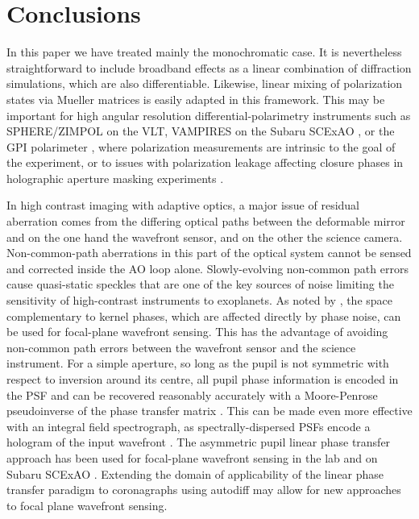 \documentclass[modern]{aastex63}
\begin{document}
\section{Conclusions}
\label{sec:conclusions}

In this paper we have treated mainly the monochromatic case. It is nevertheless straightforward to include broadband effects as a linear combination of diffraction simulations, which are also differentiable. Likewise, linear mixing of polarization states via Mueller matrices is easily adapted in this framework. This may be important for high angular resolution differential-polarimetry instruments such as SPHERE/ZIMPOL \citep{zimpol} on the VLT, VAMPIRES on the Subaru SCExAO \citep{vampires}, or the GPI polarimeter \citep{gpipol}, where polarization measurements are intrinsic to the goal of the experiment, or to issues with polarization leakage affecting closure phases in holographic aperture masking experiments \citep[e.g.][]{doelman18}.

In high contrast imaging with adaptive optics, a major issue of residual aberration comes from the differing optical paths between the deformable mirror and on the one hand the wavefront sensor, and on the other the science camera. Non-common-path aberrations in this part of the optical system cannot be sensed and corrected inside the AO loop alone. Slowly-evolving non-common path errors cause quasi-static speckles that are one of the key sources of noise limiting the sensitivity of high-contrast instruments to exoplanets. As noted by \citet{martinache13}, the space complementary to kernel phases, which are affected directly by phase noise, can be used for focal-plane wavefront sensing. This has the advantage of avoiding non-common path errors between the wavefront sensor and the science instrument. For a simple aperture, so long as the pupil is not symmetric with respect to inversion around its centre, all pupil phase information is encoded in the PSF and can be recovered reasonably accurately with a Moore-Penrose pseudoinverse of the phase transfer matrix \citep{moore1920,bjerhammar1951,penrose_1955}. This can be made even more effective with an integral field spectrograph, as spectrally-dispersed PSFs encode a hologram of the input wavefront \citep{martinache16}. The asymmetric pupil linear phase transfer approach has been used for focal-plane wavefront sensing in the lab \citep[e.g.][]{pope14,swift} and on Subaru SCExAO \citep{martinache16b}. Extending the domain of applicability of the linear phase transfer paradigm to coronagraphs using autodiff may allow for new approaches to focal plane wavefront sensing. 
\end{document}
